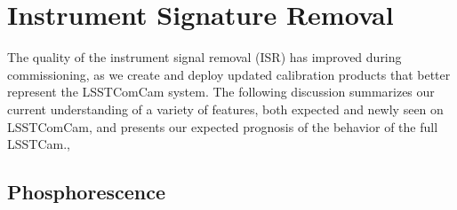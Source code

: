 %
%
%
%

\section{Instrument Signature Removal}
\label{sec:isr}
\newcommand{\czw}[1]{
  \textbf{CZW: }\textcolor{red}{#1}
}
The quality of the instrument signal removal (ISR) has improved during commissioning, as we create and deploy updated calibration products that better represent the LSSTComCam system.
The following discussion summarizes our current understanding of a variety of features, both expected and newly seen on LSSTComCam, and presents our expected prognosis of the behavior of the full LSSTCam.,

\subsection{Phosphorescence}

